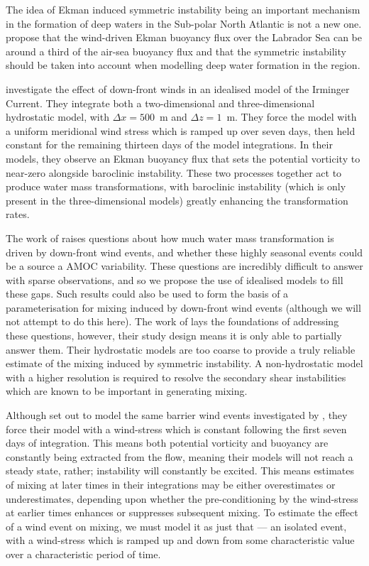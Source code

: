 The idea of Ekman induced symmetric instability being an important mechanism in the formation of deep waters in the Sub-polar North Atlantic is not a new one. \citet{Straneo2002} propose that the wind-driven Ekman buoyancy flux over the Labrador Sea can be around a third of the air-sea buoyancy flux and that the symmetric instability should be taken into account when modelling deep water formation in the region. 

\citet{Spall2016} investigate the effect of down-front winds in an idealised model of the Irminger Current. They integrate both a two-dimensional and three-dimensional hydrostatic model, with $\Delta x = 500$~m and $\Delta z = 1$~m. They force the model with a uniform meridional wind stress which is ramped up over seven days, then held constant for the remaining thirteen days of the model integrations. In their models, they observe an Ekman buoyancy flux that sets the potential vorticity to near-zero alongside baroclinic instability. These two processes together act to produce water mass transformations, with baroclinic instability (which is only present in the three-dimensional models) greatly enhancing the transformation rates.

The work of \citet{LeBras2022} raises questions about how much water mass transformation is driven by down-front wind events, and whether these highly seasonal events could be a source a AMOC variability. These questions are incredibly difficult to answer with sparse observations, and so we propose the use of idealised models to fill these gaps. Such results could also be used to form the basis of a parameterisation for mixing induced by down-front wind events (although we will not attempt to do this here). The work of \citet{Spall2016} lays the foundations of addressing these questions, however, their study design means it is only able to partially answer them. Their hydrostatic models are too coarse to provide a truly reliable estimate of the mixing induced by symmetric instability. A non-hydrostatic model with a higher resolution is required to resolve the secondary shear instabilities which are known to be important in generating mixing.

Although \citet{Spall2016} set out to model the same barrier wind events investigated by \citet{LeBras2022}, they force their model with a wind-stress which is constant following the first seven days of integration. This means both potential vorticity and buoyancy are constantly being extracted from the flow, meaning their models will not reach a steady state, rather; instability will constantly be excited. This means estimates of mixing at later times in their integrations may be either overestimates or underestimates, depending upon whether the pre-conditioning by the wind-stress at earlier times enhances or suppresses subsequent mixing. To estimate the effect of a wind event on mixing, we must model it as just that --- an isolated event, with a wind-stress which is ramped up and down from some characteristic value over a characteristic period of time.

